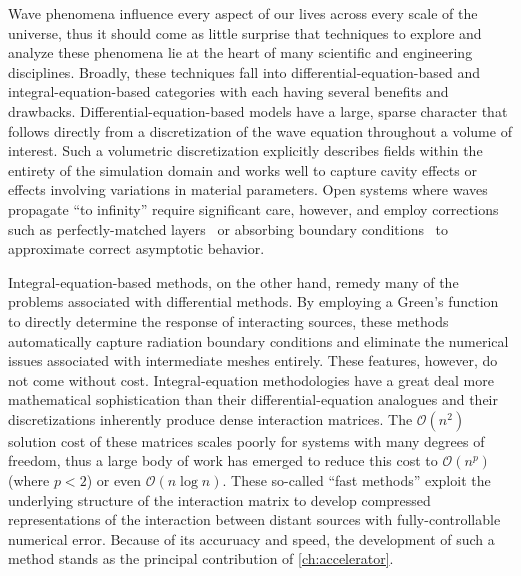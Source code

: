 Wave phenomena influence every aspect of our lives across every scale of the universe, thus it should come as little surprise that techniques to explore and analyze these phenomena lie at the heart of many scientific and engineering disciplines.
Broadly, these techniques fall into differential-equation-based and integral-equation-based categories with each having several benefits and drawbacks.
Differential-equation-based models have a large, sparse character that follows directly from a discretization of the wave equation throughout a volume of interest.
Such a volumetric discretization explicitly describes fields within the entirety of the simulation domain and works well to capture cavity effects or effects involving variations in material parameters.
Open systems where waves propagate ``to infinity'' require significant care, however, and employ corrections such as perfectly-matched layers~\cite{Berenger1994} or absorbing boundary conditions~\cite{Mur1981} to approximate correct asymptotic behavior.

Integral-equation-based methods, on the other hand, remedy many of the problems associated with differential methods.
By employing a Green's function to directly determine the response of interacting sources, these methods automatically capture radiation boundary conditions and eliminate the numerical issues associated with intermediate meshes entirely.
These features, however, do not come without cost.
Integral-equation methodologies have a great deal more mathematical sophistication than their differential-equation analogues and their discretizations inherently produce dense interaction matrices.
The $\mathcal{O}(n^2)$ solution cost of these matrices scales poorly for systems with many degrees of freedom, thus a large body of work has emerged to reduce this cost to $\mathcal{O}(n^p)$ (where $p < 2$) or even $\mathcal{O}(n \log n)$.
These so-called ``fast methods'' exploit the underlying structure of the interaction matrix to develop compressed representations of the interaction between distant sources with fully-controllable numerical error.
Because of its accuruacy and speed, the development of such a method stands as the principal contribution of \cref{ch:accelerator}.
